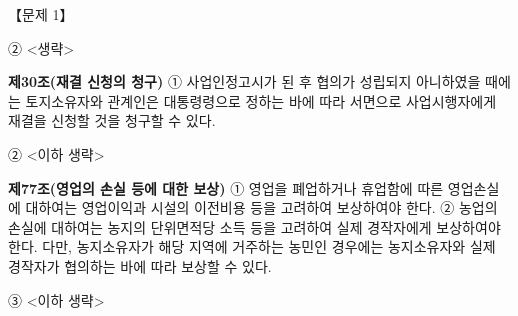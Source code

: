 \begin{longquestion}{【문제 1】}
\begin{framedtext}
② <생략> \par
\textbf{제30조(재결 신청의 청구)} ① 사업인정고시가 된 후 협의가 성립되지 아니하였을 때에는 토지소유자와 관계인은 대통령령으로 정하는 바에 따라 서면으로 사업시행자에게 재결을 신청할 것을 청구할 수 있다. \par
② <이하 생략> \par
\textbf{제77조(영업의 손실 등에 대한 보상)} ① 영업을 폐업하거나 휴업함에 따른 영업손실에 대하여는 영업이익과 시설의 이전비용 등을 고려하여 보상하여야 한다. ② 농업의 손실에 대하여는 농지의 단위면적당 소득 등을 고려하여 실제 경작자에게 보상하여야 한다. 다만, 농지소유자가 해당 지역에 거주하는 농민인 경우에는 농지소유자와 실제 경작자가 협의하는 바에 따라 보상할 수 있다. \par
③ <이하 생략> \par
\end{framedtext}
\end{longquestion}
